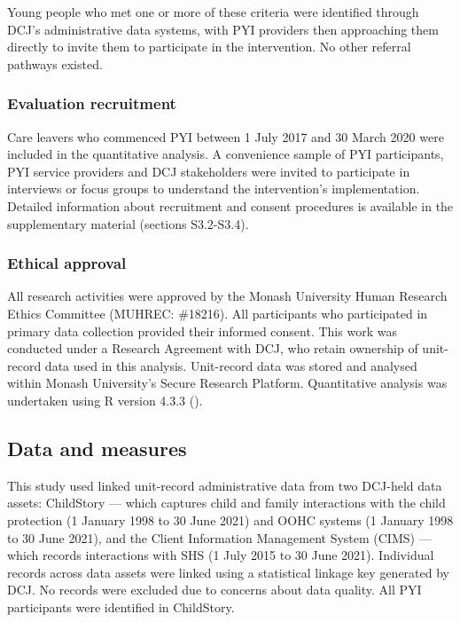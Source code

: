 \documentclass[
  jou,
  floatsintext,
  longtable,
  nolmodern,
  notxfonts,
  notimes,
  colorlinks=true,linkcolor=blue,citecolor=blue,urlcolor=blue]{apa7}
\begin{document}
Young people who met one or more of these criteria were identified
through DCJ's administrative data systems, with PYI providers then
approaching them directly to invite them to participate in the
intervention. No other referral pathways existed.

\subsubsection{Evaluation recruitment}\label{evaluation-recruitment}

Care leavers who commenced PYI between 1 July 2017 and 30 March 2020
were included in the quantitative analysis. A convenience sample of PYI
participants, PYI service providers and DCJ stakeholders were invited to
participate in interviews or focus groups to understand the
intervention's implementation. Detailed information about recruitment
and consent procedures is available in the supplementary material
(sections S3.2-S3.4).

\subsubsection{Ethical approval}\label{ethical-approval}

All research activities were approved by the Monash University Human
Research Ethics Committee (MUHREC: \#18216). All participants who
participated in primary data collection provided their informed consent.
This work was conducted under a Research Agreement with DCJ, who retain
ownership of unit-record data used in this analysis. Unit-record data
was stored and analysed within Monash University's Secure Research
Platform. Quantitative analysis was undertaken using R version 4.3.3
().

\subsection{Data and measures}\label{data-and-measures}

This study used linked unit-record administrative data from two DCJ-held
data assets: ChildStory --- which captures child and family interactions
with the child protection (1 January 1998 to 30 June 2021) and OOHC
systems (1 January 1998 to 30 June 2021), and the Client Information
Management System (CIMS) --- which records interactions with SHS (1 July
2015 to 30 June 2021). Individual records across data assets were linked
using a statistical linkage key generated by DCJ. No records were
excluded due to concerns about data quality. All PYI participants were
identified in ChildStory.
\end{document}
